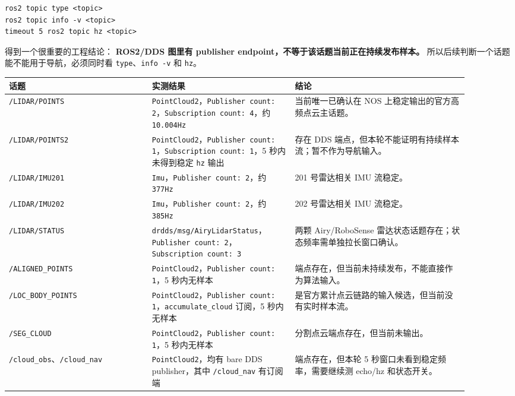 \documentclass[UTF8,11pt,a4paper]{ctexart}
\begin{document}
\begin{verbatim}
ros2 topic type <topic>
ros2 topic info -v <topic>
timeout 5 ros2 topic hz <topic>
\end{verbatim}

得到一个很重要的工程结论：
\textbf{ROS2/DDS 图里有 publisher endpoint，不等于该话题当前正在持续发布样本。}
所以后续判断一个话题能不能用于导航，必须同时看 \texttt{type}、\texttt{info -v} 和 \texttt{hz}。

\begin{center}
\renewcommand{\arraystretch}{1.18}
\begin{tabular}{p{0.28\linewidth}p{0.28\linewidth}p{0.34\linewidth}}
\toprule
\textbf{话题} & \textbf{实测结果} & \textbf{结论}\\
\midrule
\texttt{/LIDAR/POINTS} &
\texttt{PointCloud2}，\texttt{Publisher count: 2}，\texttt{Subscription count: 4}，约 \texttt{10.004Hz} &
当前唯一已确认在 NOS 上稳定输出的官方高频点云主话题。\\
\texttt{/LIDAR/POINTS2} &
\texttt{PointCloud2}，\texttt{Publisher count: 1}，\texttt{Subscription count: 1}，5 秒内未得到稳定 \texttt{hz} 输出 &
存在 DDS 端点，但本轮不能证明有持续样本流；暂不作为导航输入。\\
\texttt{/LIDAR/IMU201} &
\texttt{Imu}，\texttt{Publisher count: 2}，约 \texttt{377Hz} &
201 号雷达相关 IMU 流稳定。\\
\texttt{/LIDAR/IMU202} &
\texttt{Imu}，\texttt{Publisher count: 2}，约 \texttt{385Hz} &
202 号雷达相关 IMU 流稳定。\\
\texttt{/LIDAR/STATUS} &
\texttt{drdds/msg/AiryLidarStatus}，\texttt{Publisher count: 2}，\texttt{Subscription count: 3} &
两颗 Airy/RoboSense 雷达状态话题存在；状态频率需单独拉长窗口确认。\\
\texttt{/ALIGNED\_POINTS} &
\texttt{PointCloud2}，\texttt{Publisher count: 1}，5 秒内无样本 &
端点存在，但当前未持续发布，不能直接作为算法输入。\\
\texttt{/LOC\_BODY\_POINTS} &
\texttt{PointCloud2}，\texttt{Publisher count: 1}，\texttt{accumulate\_cloud} 订阅，5 秒内无样本 &
是官方累计点云链路的输入候选，但当前没有实时样本流。\\
\texttt{/SEG\_CLOUD} &
\texttt{PointCloud2}，\texttt{Publisher count: 1}，5 秒内无样本 &
分割点云端点存在，但当前未输出。\\
\texttt{/cloud\_obs}、\texttt{/cloud\_nav} &
\texttt{PointCloud2}，均有 bare DDS publisher，其中 \texttt{/cloud\_nav} 有订阅端 &
端点存在，但本轮 5 秒窗口未看到稳定频率，需要继续测 echo/hz 和状态开关。\\

\end{tabular}
\end{center}
\end{document}

